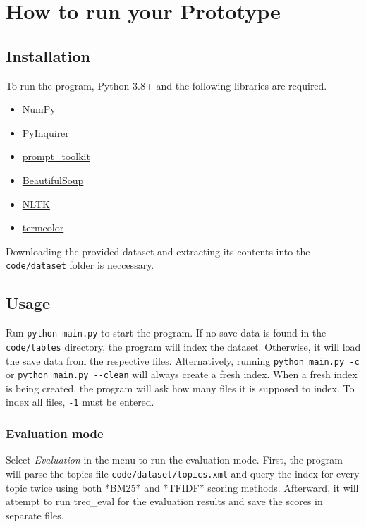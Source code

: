 \section{How to run your Prototype}
\label{sec:guide}

\subsection{Installation}

To run the program, Python 3.8+ and the following libraries are required.

\begin{itemize}
  \item \href{https://numpy.org}{NumPy}
  \item \href{https://github.com/CITGuru/PyInquirer}{PyInquirer}
  \item \href{https://github.com/prompt-toolkit/python-prompt-toolkit}{prompt\_toolkit}
  \item \href{https://www.crummy.com/software/BeautifulSoup/bs4/doc/}{BeautifulSoup}
  \item \href{https://www.nltk.org}{NLTK}
  \item \href{https://pypi.org/project/termcolor/}{termcolor}
\end{itemize}

Downloading the provided dataset and extracting its contents into the \verb|code/dataset| folder is neccessary.

\subsection{Usage}

Run \verb|python main.py| to start the program.
If no save data is found in the \verb|code/tables| directory, the program will index the dataset.
Otherwise, it will load the save data from the respective files.
Alternatively, running \verb|python main.py -c| or \verb|python main.py --clean| will always create a fresh index.
When a fresh index is being created, the program will ask how many files it is supposed to index.
To index all files, \verb|-1| must be entered.

\subsubsection{Evaluation mode}

Select \textit{Evaluation} in the menu to run the evaluation mode.
First, the program will parse the topics file \verb|code/dataset/topics.xml| and query the index for every topic twice using both *BM25* and *TFIDF* scoring methods.
Afterward, it will attempt to run trec\_eval for the evaluation results and save the scores in separate files.

